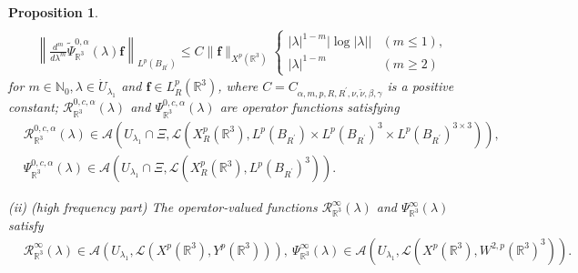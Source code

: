 \documentclass[dvipdfmx,12pt]{article}
\newtheorem{prop}[dfn]{Proposition}
\begin{document}
\begin{prop}
\begin{align*}
\\
& \left\| \frac{d^m}{d\lambda^m}\widetilde{\Psi}_{\mathbb{R}^3}^{0,\alpha} (\lambda)\mathbf{f}\right\|_{L^p( B_{R^\prime})} 
\le C\|\mathbf{f}\|_{X^p(\mathbb{R}^3)}
\begin{cases}
|\lambda|^{1-m}\left|\log |\lambda|\right| & (m\le 1), \\
|\lambda|^{1-m} &(m\ge2)
\end{cases}
\end{align*}
for $m\in\mathbb{N}_0, \lambda\in \Dot{U}_{\lambda_1}$ and $\mathbf{f}\in L_R^p(\mathbb{R}^3)$, where $C=C_{\alpha,m,p,R,R^\prime,\nu,\tilde{\nu},\beta,\gamma}$ is a positive constant; $\mathcal{R}_{\mathbb{R}^3}^{0,c,\alpha}(\lambda)$ and $\Psi_{\mathbb{R}^3}^{0,c,\alpha}(\lambda)$ are operator functions satisfying 
\begin{align*}
&\mathcal{R}_{\mathbb{R}^3}^{0,c,\alpha}(\lambda)\in \mathcal{A}(U_{\lambda_1} \cap \Xi, \mathcal{L}(X_R^{p}(\mathbb{R}^3),L^{p}(B_{R^\prime})\times L^{p}(B_{R^\prime})^3 \times L^{p}(B_{R^\prime})^{3\times3} )),\\
&\Psi_{\mathbb{R}^3}^{0,c,\alpha}(\lambda)\in \mathcal{A}(U_{\lambda_1} \cap \Xi, \mathcal{L}(X_R^{p}(\mathbb{R}^3),L^{p}(B_{R^\prime})^3)).
\end{align*}

\vskip2mm
\noindent
{\rm (ii) (high frequency part)} The operator-valued functions $\mathcal{R}_{\mathbb{R}^3}^\infty(\lambda)$ and $\Psi_{\mathbb{R}^3}^\infty(\lambda)$ satisfy 
\begin{align*}
&\mathcal{R}_{\mathbb{R}^3}^\infty(\lambda)\in \mathcal{A}(U_{\lambda_1}, \mathcal{L}(X^p(\mathbb{R}^3),Y^p(\mathbb{R}^3))),
~\Psi_{\mathbb{R}^3}^\infty(\lambda)\in \mathcal{A}(U_{\lambda_1},\mathcal{L}(X^p(\mathbb{R}^3),W^{2,p}(\mathbb{R}^3)^3) ).
\end{align*}
\end{prop}
\end{document}
